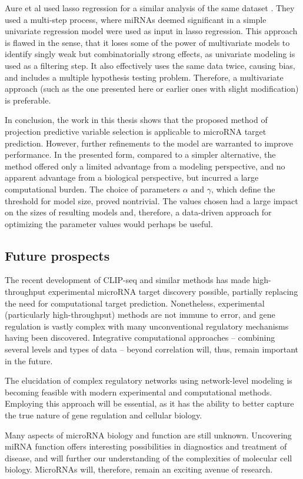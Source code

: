 Aure et al used lasso regression for a similar analysis of the same dataset
\citep{Aure2015}. They used a multi-step process, where miRNAs deemed
significant in a simple univariate regression model were used as input in
lasso regression. This approach is flawed in the sense, that it loses some of
the power of multivariate models to identify singly weak but combinatorially
strong effects, as univariate modeling is used as a filtering step. It also
effectively uses the same data twice, causing bias, and includes a
multiple hypothesis testing problem. Therefore, a multivariate
approach (such as the one presented here or earlier ones with slight modification)
is preferable.

In conclusion, the work in this thesis shows that the proposed method of
projection predictive variable selection is applicable to microRNA target
prediction. However, further refinements to the model are warranted to improve
performance. In the presented form, compared to a simpler alternative, the
method offered only a limited advantage from a modeling perspective, and no
apparent advantage from a biological perspective, but incurred a large
computational burden. The choice of parameters $\alpha$ and $\gamma$, which
define the threshold for model size, proved nontrivial. The values chosen
had a large impact on the sizes of resulting models and, therefore,
a data-driven approach for optimizing the parameter values would perhaps be useful.




\subsection*{Future prospects}

The recent development of CLIP-seq and similar methods has made high-throughput
experimental microRNA target discovery possible, partially replacing the need
for computational target prediction. Nonetheless, experimental (particularly high-throughput)
methods are not immune to error, and gene
regulation is vastly complex with many unconventional regulatory mechanisms
having been discovered. Integrative computational approaches --
combining several levels and types of data -- beyond correlation will, thus, remain
important in the future.

The elucidation of complex regulatory networks using
network-level modeling is becoming feasible with modern experimental and
computational methods. Employing this approach will be essential, as it has the
ability to better capture the true nature of gene regulation and cellular
biology.

Many aspects of microRNA biology and function are still unknown. 
Uncovering miRNA function offers interesting possibilities in diagnostics and
treatment of disease, and will further our understanding of the complexities of molecular cell biology.
MicroRNAs will, therefore, remain an exciting avenue of research.
